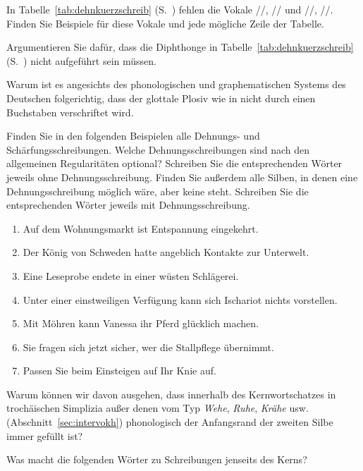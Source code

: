\Uebungen

\Uebung \label{u141} In Tabelle~\ref{tab:dehnkuerzschreib} (S.~\pageref{tab:dehnkuerzschreib}) fehlen die Vokale //, // und /\textipa{\o}/, /\textipa{\oe}/.
Finden Sie Beispiele für diese Vokale und jede mögliche Zeile der Tabelle.

\Uebung[\tristar] \label{u142} Argumentieren Sie dafür, dass die Diphthonge in Tabelle~\ref{tab:dehnkuerzschreib} (S.~\pageref{tab:dehnkuerzschreib}) nicht aufgeführt sein müssen.

\Uebung[\tristar] \label{u143} Warum ist es angesichts des phonologischen und graphematischen Systems des Deutschen folgerichtig, dass der glottale Plosiv wie in \textipa{[PEnd@]} nicht durch einen Buchstaben verschriftet wird.

\Uebung \label{u144} Finden Sie in den folgenden Beispielen alle Dehnungs- und Schärfungsschreibungen.
Welche Dehnungsschreibungen sind nach den allgemeinen Regularitäten optional?
Schreiben Sie die entsprechenden Wörter jeweils ohne Dehnungsschreibung.
Finden Sie außerdem alle Silben, in denen eine Dehnungsschreibung möglich wäre, aber keine steht.
Schreiben Sie die entsprechenden Wörter jeweils mit Dehnungsschreibung.

\begin{enumerate}\Lf
  \item Auf dem Wohnungsmarkt ist Entspannung eingekehrt.
  \item Der König von Schweden hatte angeblich Kontakte zur Unterwelt.
  \item Eine Leseprobe endete in einer wüsten Schlägerei.
  \item Unter einer einstweiligen Verfügung kann sich Ischariot nichts vorstellen.
  \item Mit Möhren kann Vanessa ihr Pferd glücklich machen.
  \item Sie fragen sich jetzt sicher, wer die Stallpflege übernimmt.
  \item Passen Sie beim Einsteigen auf Ihr Knie auf. 
\end{enumerate}

\Uebung[\tristar] \label{u145} Warum können wir davon ausgehen, dass innerhalb des Kernwortschatzes in trochäischen Simplizia außer denen vom Typ \textit{Wehe}, \textit{Ruhe}, \textit{Krähe} usw. (Abschnitt~\ref{sec:intervokh}) phonologisch der Anfangsrand der zweiten Silbe immer gefüllt ist?

\Uebung \label{u146} Was macht die folgenden Wörter zu Schreibungen jenseits des Kerns?

